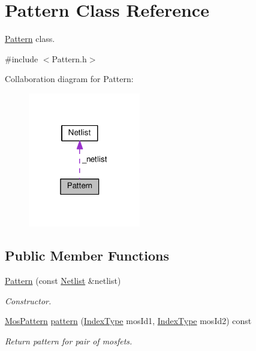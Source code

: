 \hypertarget{classPattern}{}\section{Pattern Class Reference}
\label{classPattern}


\hyperlink{classPattern}{Pattern} class.  




{\ttfamily \#include $<$Pattern.\+h$>$}



Collaboration diagram for Pattern\+:\nopagebreak
\begin{figure}[H]
\begin{center}
\leavevmode
\includegraphics[width=139pt]{classPattern__coll__graph}
\end{center}
\end{figure}
\subsection*{Public Member Functions}
\begin{DoxyCompactItemize}
\item 
\hyperlink{classPattern_a11345fc22f0ff9a01cff037c5a3e5115}{Pattern} (const \hyperlink{classNetlist}{Netlist} \&netlist)
\begin{DoxyCompactList}\small\item\em Constructor. \end{DoxyCompactList}\item 
\hyperlink{type_8h_af19eddb079bfea723256710b029c38e8}{Mos\+Pattern} \hyperlink{classPattern_a1214e024706aff22e44bb4f4266d8e97}{pattern} (\hyperlink{type_8h_a581e8093e28e7362f2b6937296190676}{Index\+Type} mos\+Id1, \hyperlink{type_8h_a581e8093e28e7362f2b6937296190676}{Index\+Type} mos\+Id2) const
\begin{DoxyCompactList}\small\item\em Return pattern for pair of mosfets. \end{DoxyCompactList}\end{DoxyCompactItemize}
